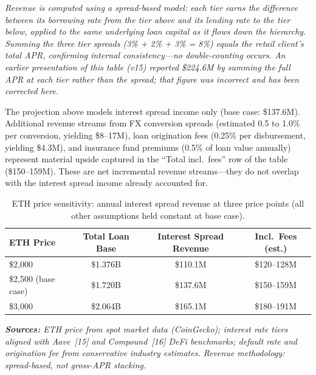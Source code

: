 \documentclass[12pt,a4paper]{report}
\newcommand{\tableheadcolor}{\rowcolor{black!8}}
\newcommand{\tableheadfont}{\bfseries\small}
\begin{document}
\vspace{2pt}
\noindent\textit{\small Revenue is computed using a \textit{spread-based} model: each tier earns the difference between its borrowing rate from the tier above and its lending rate to the tier below, applied to the same underlying loan capital as it flows down the hierarchy. Summing the three tier spreads (3\% + 2\% + 3\% = 8\%) equals the retail client's total APR, confirming internal consistency---no double-counting occurs. An earlier presentation of this table (v15) reported \$224.6M by summing the full APR at each tier rather than the spread; that figure was incorrect and has been corrected here.}

\vspace{4pt}
\noindent The projection above models interest spread income only (base case: \$137.6M). Additional revenue streams from FX conversion spreads (estimated 0.5 to 1.0\% per conversion, yielding \$8--17M), loan origination fees (0.25\% per disbursement, yielding \$4.3M), and insurance fund premiums (0.5\% of loan value annually) represent material upside captured in the ``Total incl.\ fees'' row of the table (\$150--159M). These are net incremental revenue streams---they do not overlap with the interest spread income already accounted for.

\begin{table}[H]
\centering
\caption{ETH price sensitivity: annual interest spread revenue at three price points (all other assumptions held constant at base case).}
\label{tab:revenue-sensitivity}
\small
\renewcommand{\arraystretch}{1.2}
\begin{tabular}{@{}lccc@{}}
\toprule
\tableheadcolor
\tableheadfont ETH Price & \tableheadfont Total Loan Base & \tableheadfont Interest Spread Revenue & \tableheadfont Incl.\ Fees (est.) \\
\midrule
\$2{,}000 & \$1.376B & \$110.1M & \$120--128M \\
\rowcolor{RowShade}
\$2{,}500 (base case) & \$1.720B & \$137.6M & \$150--159M \\
\$3{,}000 & \$2.064B & \$165.1M & \$180--191M \\
\bottomrule
\end{tabular}
\end{table}

\vspace{4pt}
\noindent\textit{\small\textbf{Sources:} ETH price from spot market data (CoinGecko); interest rate tiers aligned with Aave~[15] and Compound~[16] DeFi benchmarks; default rate and origination fee from conservative industry estimates. Revenue methodology: spread-based, not gross-APR stacking.}
\end{document}
